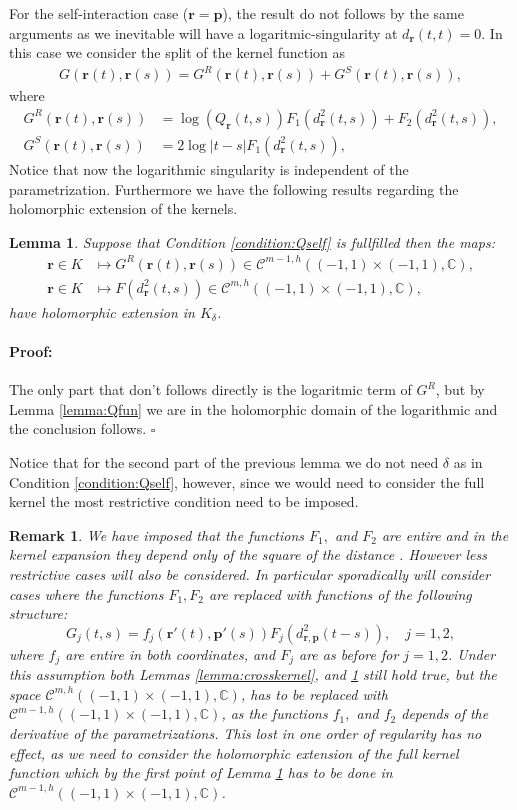 \documentclass{article}
\newtheorem{lemma}[theorem]{Lemma}
\newtheorem{remark}[theorem]{Remark}
\newenvironment{proof}{\paragraph{Proof:}}{\hfill$\square$}
\newcommand{\IC}{{\mathbb C}}
\newcommand{\bp}{{\bm p}}
\newcommand{\cmspaceh}[4]{\mathcal{C}^{#1,#2} \left( #3, #4 \right)}
\newcommand{\br}{\bm{r}}
\newcommand{\iinterv}{(-1,1)\times(-1,1)}
\begin{document}
For the self-interaction case ($\br=\bp$), the result do not follows by the same arguments as we inevitable will have a logaritmic-singularity at $d_{\br}(t,t)=0$. In this case we consider the split of the kernel function as 
\begin{align}
\label{eq:kernelsplit}
G(\br(t),\br(s) ) = G^R(\br(t),\br(s))+G^S(\br(t),\br(s)),
\end{align}
where 
\begin{align}
\label{eq:GR}
G^R(\br(t),\br(s)) &= \log(Q_{\br}(t,s)) F_1(d^2_{\br}(t,s))+F_2(d^2_{\br}(t,s)),\\
G^S(\br(t),\br(s)) &= 2\log|t-s| F_1(d^2_{\br}(t,s)),
\end{align}
Notice that now the logarithmic singularity is independent of the parametrization. Furthermore we have the following results regarding the holomorphic extension of the kernels. 
\begin{lemma}
\label{lemma:selfkernel}
Suppose that Condition \ref{condition:Qself} is fullfilled then the maps: 
\begin{align*}
\br \in K &\mapsto G^R(\br(t),\br(s)) \in \cmspaceh{m-1}{h}{\iinterv}{\IC},\\
\br \in K &\mapsto F(d^2_{\br}(t,s)) \in \cmspaceh{m}{h}{\iinterv}{\IC},
\end{align*}
have holomorphic extension in $K_\delta$.
\end{lemma}
\begin{proof}
The only part that don't follows directly is the logaritmic term of $G^R$, but by Lemma \ref{lemma:Qfun} we are in the holomorphic domain of the logarithmic and the conclusion follows. 
\end{proof}

Notice that for the second part of the previous lemma we do not need $\delta$ as in Condition \ref{condition:Qself}, however, since we would need to consider the full kernel the most restrictive condition need to be imposed. 
\begin{remark}
\label{remark:lessregularitykernel}
We have imposed that the functions $F_1,$ and $F_2$ are entire and in the kernel expansion they depend only of the square of the distance . However less restrictive cases will also be considered. In particular sporadically will consider cases where the functions $F_1,F_2$ are replaced with functions of the following structure:  
$$
G_j(t,s) = f_j(\br'(t),\bp'(s))F_j(d_{\br,\bp}^2(t-s)), \quad j=1,2,
$$
where $f_j$ are entire in both coordinates, and $F_j$ are as before for $j=1,2$. Under this assumption both Lemmas \ref{lemma:crosskernel}, and \ref{lemma:selfkernel} still hold true, but the space $\cmspaceh{m}{h}{\iinterv}{\IC}$, has to be replaced with $\cmspaceh{m-1}{h}{\iinterv}{\IC}$, as the functions $f_1,$ and $f_2$ depends of the derivative of the parametrizations. This lost in one order of regularity has no effect, as we need to consider the holomorphic extension of the full kernel function which by the first point of Lemma \ref{lemma:selfkernel} has to be done in $\cmspaceh{m-1}{h}{\iinterv}{\IC}$.
\end{remark}
\end{document}
